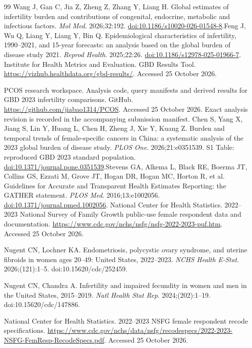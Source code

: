 \documentclass[11pt,a4paper]{article}
\begin{document}
{\begin{thebibliography}{99}
Wang J, Gan C, Jia Z, Zheng Z, Zhang Y, Liang H. Global estimates of infertility burden and contributions of congenital, endocrine, metabolic and infectious factors. \emph{Mol Med}. 2026;32:192. \href{https://doi.org/10.1186/s10020-026-01548-8}{doi:10.1186/s10020-026-01548-8}.Feng J, Wu Q, Liang Y, Liang Y, Bin Q. Epidemiological characteristics of infertility, 1990--2021, and 15-year forecasts: an analysis based on the global burden of disease study 2021. \emph{Reprod Health}. 2025;22:26. \href{https://doi.org/10.1186/s12978-025-01966-7}{doi:10.1186/s12978-025-01966-7}. Institute for Health Metrics and Evaluation. GBD Results Tool. \url{https://vizhub.healthdata.org/gbd-results/}. Accessed 25 October 2026.

 PCOS research workspace. Analysis code, query manifests and derived results for GBD 2023 infertility comparisons. GitHub. \url{https://github.com/jiabao1314/PCOS}. Accessed 25 October 2026. Exact analysis revision is recorded in the accompanying submission manifest.
Chen S, Yang X, Jiang S, Lin Y, Huang L, Chen H, Zheng J, Xie Y, Kuang Z. Burden and temporal trends of female-specific cancers in China: a systematic analysis of the 2023 global burden of disease study. \emph{PLOS One}. 2026;21:e0351539. S1 Table: reproduced GBD 2023 standard population. \href{https://doi.org/10.1371/journal.pone.0351539}{doi:10.1371/journal.pone.0351539}.Stevens GA, Alkema L, Black RE, Boerma JT, Collins GS, Ezzati M, Grove JT, Hogan DR, Hogan MC, Horton R, et al. Guidelines for Accurate and Transparent Health Estimates Reporting: the GATHER statement. \emph{PLOS Med}. 2016;13:e1002056. \href{https://doi.org/10.1371/journal.pmed.1002056}{doi:10.1371/journal.pmed.1002056}. National Center for Health Statistics. 2022--2023 National Survey of Family Growth public-use female respondent data and documentation. \url{https://www.cdc.gov/nchs/nsfg/nsfg-2022-2023-puf.htm}. Accessed 25 October 2026.

 Nugent CN, Lochner KA. Endometriosis, polycystic ovary syndrome, and uterine fibroids in women ages 20--49: United States, 2022--2023. \emph{NCHS Health E-Stat}. 2026;(121):1--5. doi:10.15620/cdc/252459.

 Nugent CN, Chandra A. Infertility and impaired fecundity in women and men in the United States, 2015--2019. \emph{Natl Health Stat Rep}. 2024;(202):1--19. doi:10.15620/cdc/147886.

 National Center for Health Statistics. 2022--2023 NSFG female respondent recode specifications. \url{https://www.cdc.gov/nchs/data/nsfg/recodespecs/2022-2023-NSFG-FemResp-RecodeSpecs.pdf}. Accessed 25 October 2026.
\end{thebibliography}
}
\end{document}
